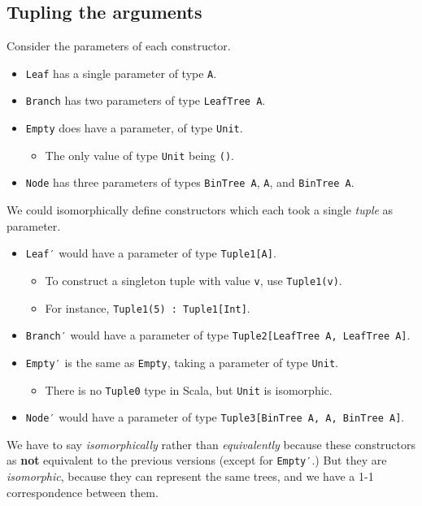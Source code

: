 \documentclass[11pt]{article}
\begin{document}
\subsection{Tupling the arguments}
\label{sec:org35fd419}
Consider the parameters of each constructor.
\begin{itemize}
\item \texttt{Leaf} has a single parameter of type \texttt{A}.
\item \texttt{Branch} has two parameters of type \texttt{LeafTree A}.
\item \texttt{Empty} does have a parameter, of type \texttt{Unit}.
\begin{itemize}
\item The only value of type \texttt{Unit} being \texttt{()}.
\end{itemize}
\item \texttt{Node} has three parameters of types \texttt{BinTree A}, \texttt{A}, and \texttt{BinTree A}.
\end{itemize}

We could isomorphically define constructors
which each took a single \emph{tuple} as parameter.
\begin{itemize}
\item \texttt{Leaf′} would have a parameter of type \texttt{Tuple1[A]}.
\begin{itemize}
\item To construct a singleton tuple with value \texttt{v}, use \texttt{Tuple1(v)}.
\item For instance, \texttt{Tuple1(5) : Tuple1[Int]}.
\end{itemize}
\item \texttt{Branch′} would have a parameter of type \texttt{Tuple2[LeafTree A, LeafTree A]}.
\item \texttt{Empty′} is the same as \texttt{Empty}, taking a parameter of type \texttt{Unit}.
\begin{itemize}
\item There is no \texttt{Tuple0} type in Scala, but \texttt{Unit} is isomorphic.
\end{itemize}
\item \texttt{Node′} would have a parameter of type \texttt{Tuple3[BinTree A, A, BinTree A]}.
\end{itemize}
We have to say \emph{isomorphically} rather than \emph{equivalently} because
these constructors as \textbf{not} equivalent to the previous versions
(except for \texttt{Empty′}.) But they are \emph{isomorphic}, because they can represent
the same trees, and we have a 1-1 correspondence between them.
\end{document}
